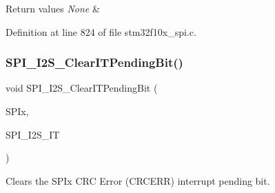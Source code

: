 \begin{DoxyRetVals}{Return values}
{\em None} & \\
\hline
\end{DoxyRetVals}


Definition at line 824 of file stm32f10x\+\_\+spi.\+c.

\mbox{\label{group___s_p_i___exported___functions_ga35a524a49ff3d058137060f751e8749f}} 
\subsubsection{\texorpdfstring{S\+P\+I\+\_\+\+I2\+S\+\_\+\+Clear\+I\+T\+Pending\+Bit()}{SPI\_I2S\_ClearITPendingBit()}}
{\footnotesize\ttfamily void S\+P\+I\+\_\+\+I2\+S\+\_\+\+Clear\+I\+T\+Pending\+Bit (\begin{DoxyParamCaption}\item[{\hyperlink{struct_s_p_i___type_def}{S\+P\+I\+\_\+\+Type\+Def} $\ast$}]{S\+P\+Ix,  }\item[{uint8\+\_\+t}]{S\+P\+I\+\_\+\+I2\+S\+\_\+\+IT }\end{DoxyParamCaption})}



Clears the S\+P\+Ix C\+RC Error (C\+R\+C\+E\+RR) interrupt pending bit. 



